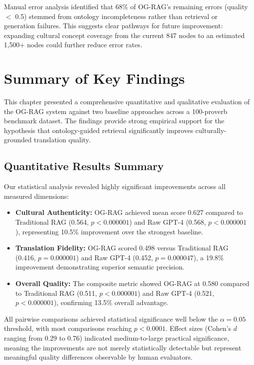 Manual error analysis identified that 68\% of OG-RAG's remaining errors (quality $<$ 0.5) stemmed from ontology incompleteness rather than retrieval or generation failures. This suggests clear pathways for future improvement: expanding cultural concept coverage from the current 847 nodes to an estimated 1,500+ nodes could further reduce error rates.

\section{Summary of Key Findings}
\label{sec:summary_findings}

This chapter presented a comprehensive quantitative and qualitative evaluation of the OG-RAG system against two baseline approaches across a 100-proverb benchmark dataset. The findings provide strong empirical support for the hypothesis that ontology-guided retrieval significantly improves culturally-grounded translation quality.

\subsection{Quantitative Results Summary}
\label{subsec:quant_summary}

Our statistical analysis revealed highly significant improvements across all measured dimensions:

\begin{itemize}
    \item \textbf{Cultural Authenticity:} OG-RAG achieved mean score 0.627 compared to Traditional RAG (0.564, $p < 0.000001$) and Raw GPT-4 (0.568, $p < 0.000001$), representing 10.5\% improvement over the strongest baseline.
    
    \item \textbf{Translation Fidelity:} OG-RAG scored 0.498 versus Traditional RAG (0.416, $p = 0.000001$) and Raw GPT-4 (0.452, $p = 0.000047$), a 19.8\% improvement demonstrating superior semantic precision.
    
    \item \textbf{Overall Quality:} The composite metric showed OG-RAG at 0.580 compared to Traditional RAG (0.511, $p < 0.000001$) and Raw GPT-4 (0.521, $p < 0.000001$), confirming 13.5\% overall advantage.
\end{itemize}

All pairwise comparisons achieved statistical significance well below the $\alpha = 0.05$ threshold, with most comparisons reaching $p < 0.0001$. Effect sizes (Cohen's $d$ ranging from 0.29 to 0.76) indicated medium-to-large practical significance, meaning the improvements are not merely statistically detectable but represent meaningful quality differences observable by human evaluators.

